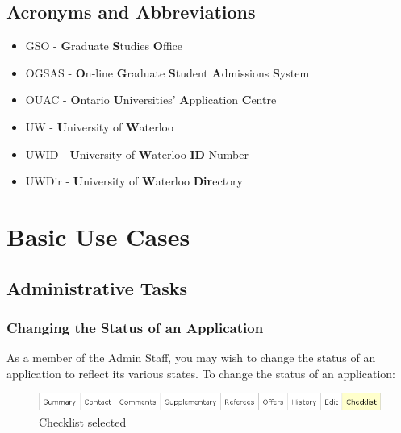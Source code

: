 \documentclass[titlepage]{article}
\begin{document}
\subsection{Acronyms and Abbreviations}
\begin{itemize}
\item GSO - \textbf{G}raduate \textbf{S}tudies \textbf{O}ffice
\item OGSAS - \textbf{O}n-line \textbf{G}raduate \textbf{S}tudent \textbf{A}dmissions \textbf{S}ystem
\item OUAC - \textbf{O}ntario \textbf{U}niversities' \textbf{A}pplication
\textbf{C}entre
\item UW - \textbf{U}niversity of \textbf{W}aterloo
\item UWID - \textbf{U}niversity of \textbf{W}aterloo \textbf{ID} Number
\item UWDir - \textbf{U}niversity of \textbf{W}aterloo \textbf{Dir}ectory
\end{itemize}


\newpage
\section{Basic Use Cases}
\label{tBasic}
\setcounter{figure}{0}

\subsection{Administrative Tasks}

\subsubsection{Changing the Status of an Application}
\label{yChangeStatusSection}
As a member of the Admin Staff, you may wish to change the status of an
application to reflect its various states. To change the status of an
application:

\begin{figure}[h!]
  \begin{center}
  \includegraphics[width=13cm]{apptabs_checklist.png}
  \end{center}
  \caption{Checklist selected}
  \label{yChecklist}
\end{figure}
\end{document}
